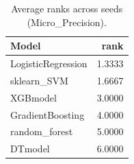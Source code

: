 \begin{table}[t]
\centering
\begin{tabular}{lr}
\toprule
Model & rank \\
\midrule
LogisticRegression & 1.3333 \\
sklearn_SVM & 1.6667 \\
XGBmodel & 3.0000 \\
GradientBoosting & 4.0000 \\
random_forest & 5.0000 \\
DTmodel & 6.0000 \\
\bottomrule
\end{tabular}
\caption{Average ranks across seeds (Micro_Precision).}
\label{tab:avg_rank_Micro_Precision}
\end{table}